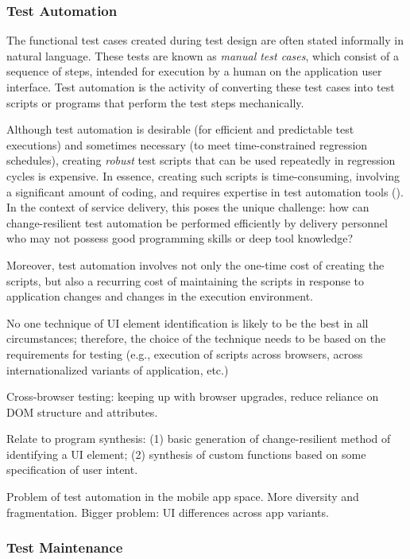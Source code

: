 

\subsubsection{Test Automation}
\label{sec:test-automation}

The functional test cases created during test design are often stated informally
in natural language. These tests are known as \textit{manual test cases}, which
consist of a sequence of steps, intended for execution by a human on the
application user interface.  Test automation is the activity of converting these
test cases into test scripts or programs that perform the test steps
mechanically.

Although test automation is desirable (\eg for efficient and predictable test
executions) and sometimes necessary (\eg to meet time-constrained regression
schedules), creating \textit{robust} test scripts that can be used repeatedly in
regression cycles is expensive. In essence, creating such scripts is
time-consuming, involving a significant amount of coding, and requires expertise
in test automation tools (\eg \cite{hpqtp,ibmrft,selenium}). In the context of
service delivery, this poses the unique challenge: how can change-resilient test
automation be performed efficiently by delivery personnel who may not possess
good programming skills or deep tool knowledge?

Moreover, test automation involves not only the one-time cost of creating the
scripts, but also a recurring cost of maintaining the scripts in response to
application changes and changes in the execution environment.

No one technique of UI element identification is likely to be the best in all
circumstances; therefore, the choice of the technique needs to be based on the
requirements for testing (e.g., execution of scripts across browsers, across
internationalized variants of application, etc.)

Cross-browser testing: keeping up with browser upgrades, reduce reliance on DOM
structure and attributes.

Relate to program synthesis: (1) basic generation of change-resilient method of
identifying a UI element; (2) synthesis of custom functions based on some
specification of user intent.

Problem of test automation in the mobile app space. More diversity and
fragmentation. Bigger problem: UI differences across app variants.

\subsubsection{Test Maintenance}
\label{sec:test-maintenance}




